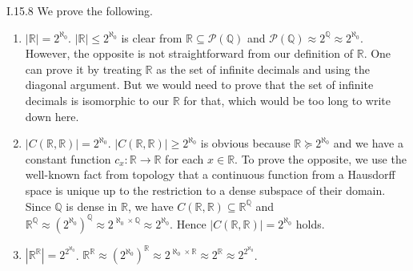\documentclass[12pt]{article}
\begin{document}
\begin{customthm}{I.15.8}
  We prove the following.
  \begin{enumerate}
    \item\underline{$|\mathbb{R}|=2^{\aleph_0}$}. $|\mathbb{R}|\leq2^{\aleph_0}$ is clear from $\mathbb{R}\subseteq{\mathcal{P}(\mathbb{Q})}$ and $\mathcal{P}(\mathbb{Q})\approx2^\mathbb{Q}\approx2^{\aleph_0}$. However, the opposite is not straightforward from our definition of $\mathbb{R}$. One can prove it by treating $\mathbb{R}$ as the set of infinite decimals and using the diagonal argument. But we would need to prove that the set of infinite decimals is isomorphic to our $\mathbb{R}$ for that, which would be too long to write down here.
    \item\underline{$|C(\mathbb{R},\mathbb{R})|=2^{\aleph_0}$}. $|C(\mathbb{R},\mathbb{R})|\geq2^{\aleph_0}$ is obvious because $\mathbb{R}\succcurlyeq2^{\aleph_0}$ and we have a constant function $c_x:\mathbb{R}\rightarrow\mathbb{R}$ for each $x\in\mathbb{R}$. To prove the opposite, we use the well-known fact from topology that a continuous function from a Hausdorff space is unique up to the restriction to a dense subspace of their domain. Since $\mathbb{Q}$ is dense in $\mathbb{R}$, we have $C(\mathbb{R},\mathbb{R})\subseteq\mathbb{R}^\mathbb{Q}$ and $\mathbb{R}^\mathbb{Q}\approx(2^{\aleph_0})^\mathbb{Q}\approx2^{\aleph_0\times\mathbb{Q}}\approx2^{\aleph_0}$. Hence $|C(\mathbb{R},\mathbb{R})|=2^{\aleph_0}$ holds.
    \item\underline{$|\mathbb{R}^\mathbb{R}|=2^{2^{\aleph_0}}$}. $\mathbb{R}^\mathbb{R}\approx (2^{\aleph_0})^\mathbb{R}\approx 2^{\aleph_0\times\mathbb{R}}\approx2^\mathbb{R}\approx2^{2^{\aleph_0}}$.
  \end{enumerate}
\end{customthm}
\end{document}
